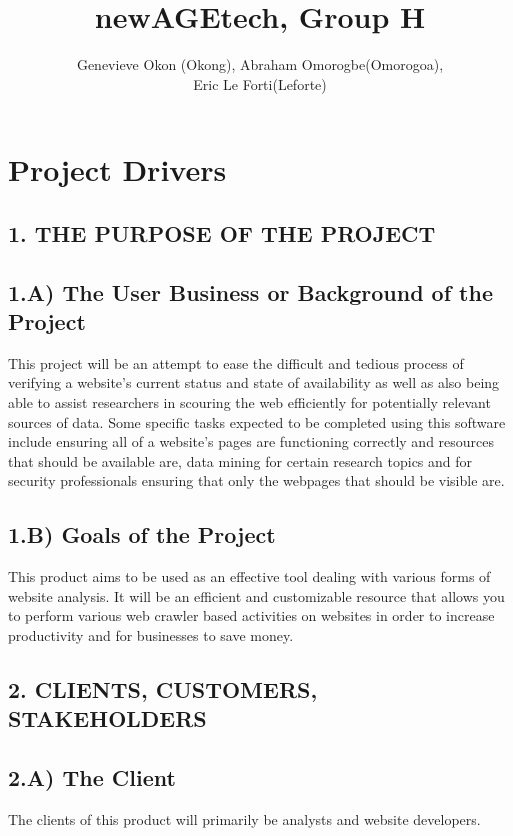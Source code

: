 \documentclass[12pt]{article}
\begin{document}
\title{newAGEtech, Group H }
\author{Genevieve Okon (Okong), Abraham Omorogbe(Omorogoa),\\
 Eric Le Forti(Leforte)}
\maketitle


\section*{Project Drivers}

\subsection*{1. THE PURPOSE OF THE PROJECT}

\subsection*{1.A) The User Business or Background of the Project}
This project will be an attempt to ease the difficult and tedious process of verifying a website’s current status and state of availability as well as also being able to assist researchers in scouring the web efficiently for potentially relevant sources of data. Some specific tasks expected to be completed using this software include ensuring all of a website’s pages are functioning correctly and resources that should be available are, data mining for certain research topics and for security professionals ensuring that only the webpages that should be visible are.

\subsection*{1.B) Goals of the Project}
This product aims to be used as an effective tool dealing with various forms of website analysis. It will be an efficient and customizable resource that allows you to perform various web crawler based activities on websites in order to increase productivity and for businesses to save money.


\subsection*{2. CLIENTS, CUSTOMERS, STAKEHOLDERS}

\subsection*{2.A) The Client}
The clients of this product will primarily be analysts and website developers.
\end{document}
